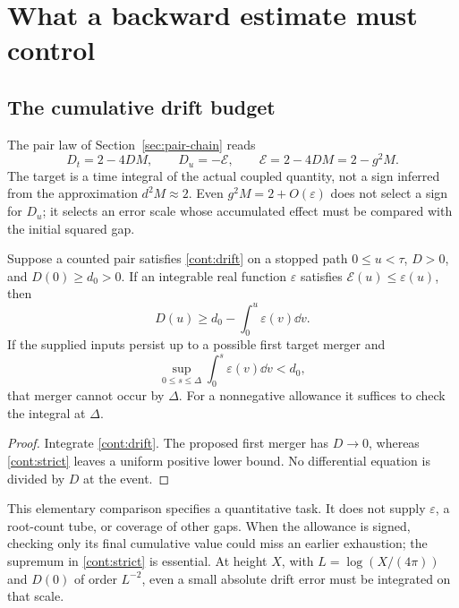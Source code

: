 \section{What a backward estimate must control}
\label{sec:continuation}

\subsection{The cumulative drift budget}

The pair law of Section~\ref{sec:pair-chain} reads
\begin{equation}
 D_t=2-4DM,\qquad
 D_u=-\mathcal E,\qquad
 \mathcal E=2-4DM=2-g^2M.
 \label{cont:drift}
\end{equation}
The target is a time integral of the actual coupled quantity, not a
sign inferred from the approximation $d^2M\approx2$. Even
$g^2M=2+O(\varepsilon)$ does not select a sign for $D_u$; it selects
an error scale whose accumulated effect must be compared with the
initial squared gap.

\begin{proposition}
\label{cont:cumulative}
Suppose a counted pair satisfies \eqref{cont:drift} on a stopped path
$0\le u<\tau$, $D>0$, and $D(0)\ge d_0>0$. If an integrable real
function $\varepsilon$ satisfies $\mathcal E(u)\le\varepsilon(u)$,
then
\begin{equation}
 D(u)\ge d_0-\int_0^u\varepsilon(v)\dd v.
 \label{cont:integral}
\end{equation}
If the supplied inputs persist up to a possible first target merger
and
\begin{equation}
 \sup_{0\le s\le\Delta}\int_0^s\varepsilon(v)\dd v<d_0,
 \label{cont:strict}
\end{equation}
that merger cannot occur by $\Delta$. For a nonnegative allowance it
suffices to check the integral at $\Delta$.
\end{proposition}

\begin{proof}
Integrate \eqref{cont:drift}. The proposed first merger has $D\to0$,
whereas \eqref{cont:strict} leaves a uniform positive lower bound.
No differential equation is divided by $D$ at the event.
\end{proof}

This elementary comparison specifies a quantitative task. It does not
supply $\varepsilon$, a root-count tube, or coverage of other gaps.
When the allowance is signed, checking only its final cumulative value
could miss an earlier exhaustion; the supremum in
\eqref{cont:strict} is essential. At height $X$, with
$L=\log(X/(4\pi))$ and $D(0)$ of order $L^{-2}$, even a small
absolute drift error must be integrated on that scale.


